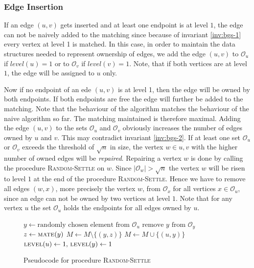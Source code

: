\documentclass{article}      %
\begin{document}
\subsubsection{Edge Insertion}
\label{sec:bgs-edge-in}

If an edge $(u,v)$ gets inserted and at least one endpoint is at level $1$, the edge can not be naively added to the matching since because of invariant \ref{inv:bgs-1} every vertex at level 1 is matched. In this case, in order to maintain the data structures needed to represent ownership of edges, we add the edge $(u,v)$ to $\mathcal{O}_u$ if $\mathit{level}(u)=1$ or to $\mathcal{O}_v$ if $\mathit{level}(v)=1$. Note, that if both vertices are at level $1$, the edge will be assigned to $u$ only.

Now if no endpoint of an ede $(u,v)$ is at level 1, then the edge will be owned by both endpoints. If both endpoints are free the edge will further be added to the matching. Note that the behaviour of the algorithm matches the behaviour of the naive algorithm so far. The matching maintained is therefore maximal. Adding the edge $(u,v)$ to the sets $\mathcal{O}_u$ and $\mathcal{O}_v$ obviously increases the number of edges owned by $u$ and $v$. This may contradict invariant \ref{inv:bgs-2}. If at least one set $\mathcal{O}_u$ or $\mathcal{O}_v$ exceeds the threshold of $\sqrt{n}$ in size, the vertex $w \in {u,v}$ with the higher number of owned edges will be \emph{repaired}. Repairing a vertex $w$ is done by calling the procedure \textsc{Random-Settle} on $w$. Since $|\mathcal{O}_w|>\sqrt{n}$ the vertex $w$ will be risen to level $1$ at the end of the procedure \textsc{Random-Settle}. Hence we have to remove all edges $(w,x)$, more precisely the vertex $w$, from $\mathcal{O}_x$ for all vertices $x \in \mathcal{O}_u$, since an edge can not be owned by two vertices at level $1$. Note that for any vertex $u$ the set $\mathcal{O}_u$ holds the endpoints for all edges owned by $u$.

\begin{figure}
\center

\begin{algorithmic}[1]
\State $y \gets \text{randomly chosen element from }\mathcal{O}_u$
	\State $\text{remove } y \text{ from } \mathcal{O}_y$
\EndFor
\State $z \gets \textsc{mate}(y)$
	\State $M \gets M \setminus \{(y,z)\}$
\EndIf
\State $M \gets M \cup \{(u,y)\}$
\State $\textsc{level}(u) \gets 1,\,\textsc{level}(y) \gets 1$
\State {}
\EndProcedure
\end{algorithmic}

\caption{Pseudocode for procedure \textsc{Random-Settle}}
\label{pscd:bgs-rs}
\end{figure}
\end{document}
